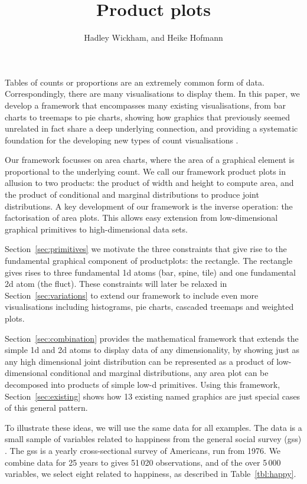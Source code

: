 \documentclass[journal]{vgtc}
\title{Product plots}
\author{Hadley Wickham, and Heike Hofmann}
\begin{document}
\maketitle

Tables of counts or proportions are an extremely common form of data. Correspondingly, there are many visualisations to display them. In this paper, we develop a framework that encompasses many existing visualisations, from bar charts to treemaps to pie charts, showing how graphics that previously seemed unrelated in fact share a deep underlying connection, and providing a systematic foundation for the developing new types of count visualisations \citep{cox:1978}.

Our framework focusses on area charts, where the area of a graphical element is proportional to the underlying count. We call our framework product plots in allusion to two products: the product of width and height to compute area, and the product of conditional and marginal distributions to produce joint distributions. A key development of our framework is the inverse operation: the factorisation of area plots. This allows easy extension from low-dimensional graphical primitives to high-dimensional data sets.

Section~\ref{sec:primitives} we motivate the three constraints that give rise to the fundamental graphical component of productplots: the rectangle. The rectangle gives rises to three fundamental 1d atoms (bar, spine, tile) and one fundamental 2d atom (the fluct). These constraints will later be relaxed in Section~\ref{sec:variations} to extend our framework to include even more visualisations including histograms, pie charts, cascaded treemaps and weighted plots.

Section~\ref{sec:combination} provides the mathematical framework that extends the simple 1d and 2d atoms to display data of any dimensionality, by showing just as any high dimensional joint distribution can be represented as a product of low-dimensional conditional and marginal distributions, any area plot can be decomposed into products of simple low-d primitives. Using this framework, Section~\ref{sec:existing} shows how 13 existing named graphics are just special cases of this general pattern.

To illustrate these ideas, we will use the same data for all examples. The data is a small sample of variables related to happiness from the general social survey ({\sc gss}) \citep{davis:2008}. The {\sc gss} is a yearly cross-sectional survey of Americans, run from 1976. We combine data for 25 years to gives 51\,020 observations, and of the over 5\,000 variables, we select eight related to happiness, as described in Table~\ref{tbl:happy}.
\end{document}
